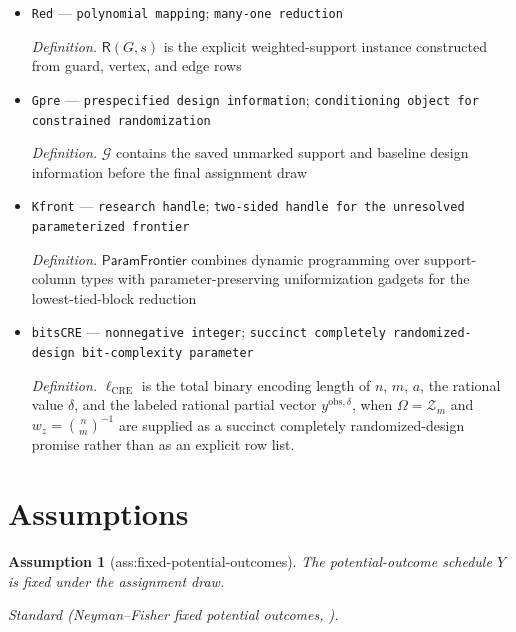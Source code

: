 \documentclass{article}
\newtheorem{assumption}{Assumption}
\begin{document}
\begin{itemize}
  \par\smallskip\noindent\emph{Definition.} \(q_\star=\{1+vA_\star+sB+\binom{s}{2}\}/W_\star\)
  \item \texttt{Red} --- \texttt{polynomial mapping}; \texttt{many-\allowbreak{}one reduction}
  \par\smallskip\noindent\emph{Definition.} \(\mathsf R(G,s)\) is the explicit weighted-support instance constructed from guard, vertex, and edge rows
  \item \texttt{Gpre} --- \texttt{prespecified design information}; \texttt{conditioning object for constrained randomization}
  \par\smallskip\noindent\emph{Definition.} \(\mathscr G\) contains the saved unmarked support and baseline design information before the final assignment draw
  \item \texttt{Kfront} --- \texttt{research handle}; \texttt{two-\allowbreak{}sided handle for the unresolved parameterized frontier}
  \par\smallskip\noindent\emph{Definition.} \(\mathsf{ParamFrontier}\) combines dynamic programming over support-column types with parameter-preserving uniformization gadgets for the lowest-tied-block reduction
  \item \texttt{bitsCRE} --- \texttt{nonnegative integer}; \texttt{succinct completely randomized-\allowbreak{}design bit-\allowbreak{}complexity parameter}
  \par\smallskip\noindent\emph{Definition.} \(\ell_{\mathrm{CRE}}\) is the total binary encoding length of \(n\), \(m\), \(a\), the rational value \(\delta\), and the labeled rational partial vector \(y^{\mathrm{obs},\delta}\), when \(\Omega=\mathcal Z_m\) and \(w_z=\binom{n}{m}^{-1}\) are supplied as a succinct completely randomized-design promise rather than as an explicit row list.
\end{itemize}

\section{Assumptions}

\begin{assumption}[ass:fixed-potential-outcomes]\label{ass:fixed-potential-outcomes}
The potential-outcome schedule \(Y\) is fixed under the assignment draw.
\par\smallskip\noindent\emph{Standard} (Neyman--Fisher fixed potential outcomes, \cite{Fisher1935}).
\end{assumption}
\end{document}
